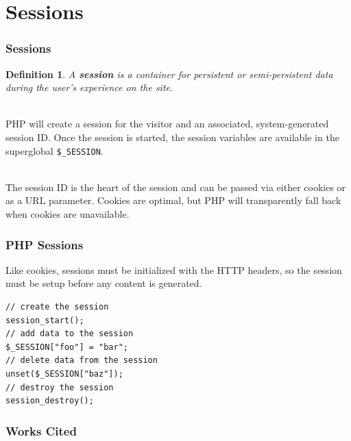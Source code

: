 \documentclass[aspectratio=169]{beamer}
\newtheorem{defn}{Definition}
\begin{document}
\section{Sessions}
\begin{frame}
\frametitle{Sessions}
\begin{defn}
A \textbf{session} is a container for persistent or semi-persistent data during the user's experience on the site.
\end{defn}

\mbox{}\\
PHP will create a session for the visitor and an associated, system-generated session ID. Once the session is started, the session variables are available in the superglobal \texttt{\$\_SESSION}.

\mbox{}\\
The session ID is the heart of the session and can be passed via either cookies or as a URL parameter. Cookies are optimal, but PHP will transparently fall back when cookies are unavailable. \cite{php}
\end{frame}

\begin{frame}[fragile]
\frametitle{PHP Sessions}
Like cookies, sessions must be initialized with the HTTP headers, so the session must be setup before any content is generated.
\begin{lstlisting}[caption=Using a PHP Session,label=code:session]
// create the session
session_start();
// add data to the session
$_SESSION["foo"] = "bar";
// delete data from the session
unset($_SESSION["baz"]);
// destroy the session
session_destroy();
\end{lstlisting}
\end{frame}

\begin{frame}
\frametitle{Works Cited}

\end{frame}
\end{document}

